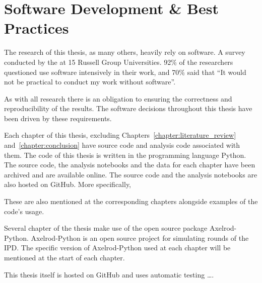 \section{Software Development \& Best Practices}\label{section:introduction_software_development}

The research of this thesis, as many others, heavily rely on software.
A survey conducted by the at 15 Russell Group Universities.
92\% of the researchers questioned use software intensively in 
their work, and 70\% said that ``It would not be practical to 
conduct my work without software''.

As with all research there is an obligation to ensuring the correctness and
reproducibility of the results. The software decisions throughout this thesis
have been driven by these requirements.

Each chapter of this thesis, excluding Chapters~\ref{chapter:literature_review}
and~\ref{chapter:conclusion} have source code and analysis code associated with
them. The code of this thesis is written in the programming language Python. The
source code, the analysis notebooks and the data for each chapter have been
archived and are available online. The source code and the analysis notebooks
are also hosted on GitHub. More specifically,

\begin{table}[htbp]
    \centering
    \caption{Citations and GitHub url for source code and data used in the thesis.}
    \label{table:source_code_data_citations}
\end{table}

These are also mentioned at the corresponding chapters alongside examples of
the code's usage.

Several chapter of the thesis make use of the open source package Axelrod-Python.
Axelrod-Python is an open source project for simulating rounds of the IPD.
The specific version of Axelrod-Python used at each chapter will be mentioned
at the start of each chapter.

This thesis itself is hosted on GitHub and uses automatic testing \dots.
